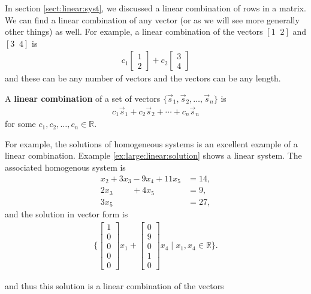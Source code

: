 In section \ref{sect:linear:syst}, we discussed a linear combination of rows in a matrix.  We can find a linear combination of any vector (or as we will see more generally other things) as well.  For example, a linear combination of the vectors $[1\;\;2]$ and $[3\;\;4]$ is
%
\begin{align*}
c_1 \begin{bmatrix}
1 \\2
\end{bmatrix} + c_2 \begin{bmatrix}
3 \\4
\end{bmatrix}
\end{align*}
and these can be any number of vectors and the vectors can be any length.

\begin{definition}
A \textbf{linear combination} of a set of vectors $\{ \vec{s}_1, \vec{s}_2, \ldots, \vec{s}_n \}$ is
%
\begin{align*}
c_1 \vec{s}_1+ c_2 \vec{s}_2 +  \cdots + c_n \vec{s}_n
\end{align*}
for some $c_1, c_2, \ldots, c_n \in \mathbb{R}$.
\end{definition}

For example, the solutions of homogeneous systems is an excellent example of a linear combination.  Example \ref{ex:large:linear:solution} shows a linear system.  The associated homogenous system is
 \begin{align*}
x_2 + 3x_3 -9 x_4 + 11 x_5 & = 14, \\
2x_3 \phantom{-9x_4} + 4x_5 & = 9, \\
3x_5 & = 27,
\end{align*}
and the solution in vector form is
\begin{align*}
\{ \begin{bmatrix}
1 \\ 0 \\ 0 \\ 0 \\0
\end{bmatrix} x_1 +
\begin{bmatrix}
0 \\ 9 \\ 0 \\ 1 \\ 0
\end{bmatrix} x_4 \;  | \; x_1, x_4 \in \mathbb{R} \}.
\end{align*}

and thus this solution is a linear combination of the vectors

